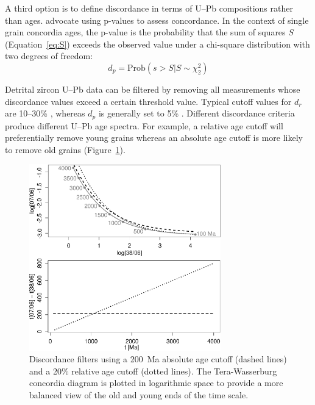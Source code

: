 \documentclass[gchron, manuscript]{copernicus}
\begin{document}
A third option is to define discordance in terms of U--Pb compositions
rather than ages. \citet{spencer2016} advocate using p-values to
assess concordance. In the context of single grain concordia ages, the
p-value is the probability that the sum of squares $S$
(Equation~\ref{eq:S}) exceeds the observed value under a chi-square
distribution with two degrees of freedom:
\begin{equation}
  d_p = \mbox{Prob}\left(s > S | S \sim \chi^2_2
    \right)
  \label{eq:dp}
\end{equation}

Detrital zircon U--Pb data can be filtered by removing all
measurements whose discordance values exceed a certain threshold
value. Typical cutoff values for $d_r$ are 10--30\%
\citep{gehrels2011}, whereas $d_p$ is generally set to 5\%
\citep{spencer2016}. Different discordance criteria produce different
U--Pb age spectra. For example, a relative age cutoff will
preferentially remove young grains whereas an absolute age cutoff is
more likely to remove old grains (Figure~\ref{fig:agediscordance}).

\begin{figure}[t]
  \includegraphics[width=8.3cm]{TW-option-12.pdf}
  \caption{Discordance filters using a 200~Ma absolute age cutoff
    (dashed lines) and a 20\% relative age cutoff (dotted
    lines). The Tera-Wasserburg concordia diagram is plotted in
    logarithmic space to provide a more balanced view of the old and
    young ends of the time scale.
  }
  \label{fig:agediscordance}
\end{figure}
\end{document}
